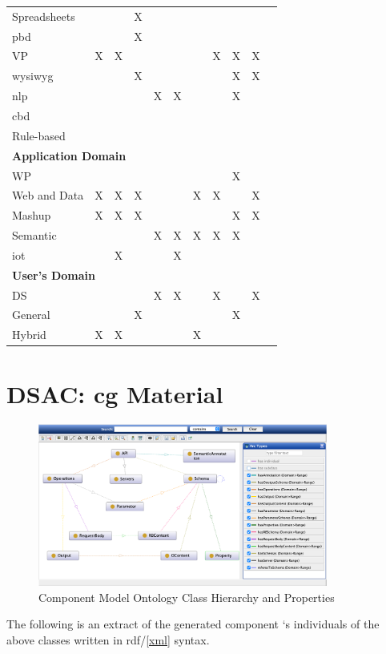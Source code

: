 \begin{appendix}
\begin{longtable}{@{}lcccccccccc@{}}
\bottomrule
\endlastfoot

\multicolumn{10}{l}{\textbf{EUP Technique}} \tabularnewline
\midrule
Spreadsheets & & & X & & & & & & \tabularnewline
\gls{pbd} & & & X & & & & & & \tabularnewline
VP & X & X & & & & & X & X & X \tabularnewline
\gls{wysiwyg} & & & X & & & & & X & X \tabularnewline
\gls{nlp} & & & & X & X & & & X & \tabularnewline
\gls{cbd} & & & & & & & & & \tabularnewline
Rule-based& & & & & & & & &  \tabularnewline

\midrule
\multicolumn{10}{l}{\textbf{Application Domain}} \tabularnewline
\midrule
WP & & & & & & & & X &  \tabularnewline
Web and Data & X & X & X & & & X & X & & X \tabularnewline
Mashup & X & X & X & & & & & X & X \tabularnewline
Semantic & & & & X & X & X & X & X & \tabularnewline
\gls{iot} & & X & & & X & & & & \tabularnewline

\midrule
\multicolumn{10}{l}{\textbf{User's Domain}} \tabularnewline
\midrule
DS  & & & & X & X & & X & & X \tabularnewline
General & & & X & & & & & X & \tabularnewline
Hybrid & X & X & & & & X & & & \tabularnewline

\end{longtable}


\chapter{DSAC: \gls{cg} Material}

\begin{figure}[hbt]
\hypertarget{fig:app.cg-material}{%
\centering
\includegraphics[width=0.85\textwidth]{../figures/MyFigures/protegeScreen.png}
\captionsetup{justification=centering}
\caption{Component Model Ontology Class Hierarchy and Properties}\label{fig:app.cg-material}
}
\end{figure}

The following is an extract of the generated component ‘s individuals of the above classes written in \gls{rdf}/\cref{xml} syntax. 
\begin{lstlisting}[language=JavaScript, captionpos=t, caption=Component Ontology individuals]


\end{lstlisting}
\end{appendix}
